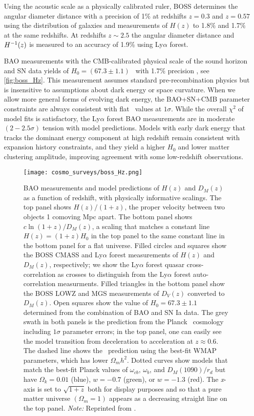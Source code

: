 Using the acoustic scale as a physically calibrated ruler, BOSS determines the angular diameter distance with a precision of 1\% at redshifts $z = 0.3$ and $z = 0.57$ using the distribution of galaxies and measurements of $H(z)$ to 1.8\% and 1.7\%  at the same redshifts. At redshifts $z\sim2.5$ the  angular diameter distance and $H^{-1}(z)$ is measured to an accuracy of 1.9\% using Ly$\alpha$ forest.

BAO measurements with the CMB-calibrated physical scale of the sound horizon and SN data yields of $H_0=(67.3\pm1.1)$ \unith\ with 1.7\% precision \cite{BOSS_results}, see \autoref{fig:boss_Hz}. This measurement assumes standard pre-recombination physics but is insensitive to assumptions about dark energy or space curvature. When we allow more general forms of evolving dark energy, the BAO+SN+CMB parameter constraints are always consistent with flat \LCDM\ values at $1\sigma$. While the overall $\chi^2$ of model fits is satisfactory, the Ly$\alpha$ forest BAO measurements are in moderate $(2-2.5\sigma)$ tension with model predictions. Models with early dark energy that tracks the dominant energy component at high redshift remain consistent with expansion history constraints, and they yield a higher $H_0$ and lower matter clustering amplitude, improving agreement with some low-redshift observations.
\begin{figure}[htbp]
    \centering
    \texttt{[image: cosmo\_surveys/boss\_Hz.png]}
    \caption{BAO measurements and model predictions of \(H(z)\) and \(D_M(z)\) as a function of redshift, with physically informative scalings. The top panel shows \(H(z)/(1+z)\), the proper velocity between two objects 1 comoving Mpc apart. The bottom panel shows \(c\ln{(1+z)}/D_M(z)\), a scaling that matches a constant line \(H(z)=(1+z)H_0\) in the top panel to the same constant line in the bottom panel for a flat universe. Filled circles and squares show the BOSS CMASS and Ly$\alpha$ forest measurements of \(H(z)\) and \(D_M(z)\), respectively; we show the Ly$\alpha$ forest quasar cross-correlation as crosses to distinguish from the Ly$\alpha$ forest auto-correlation measurments. Filled triangles in the bottom panel show the BOSS LOWZ and MGS measurements of \(D_V (z)\) converted to \(D_M(z)\). Open squares show the value of \(H_0 = 67.3\pm1.1\) \unith determined from the combination of BAO and SN Ia data. The grey swath in both panels is the prediction from the Planck \LCDM\ cosmology including \(1\sigma\) parameter errors; in the top panel, one can easily see the model transition from deceleration to acceleration at \(z\approx0.6\). The dashed line shows the \LCDM\ prediction using the best-fit WMAP parameters, which has lower \(\Omega_mh^2\). Dotted curves show models that match the best-fit Planck values of \(\omega_{cb}\), \(\omega_{b}\), and \(D_M(1090)/r_d\) but have \(\Omega_k = 0.01\) (blue), \(w = -0.7\) (green), or \(w = -1.3\) (red). The \textit{x}-axis is set to \(\sqrt{1+z}\) both for display purposes and so that a pure matter universe \((\Omega_m = 1)\) appears as a decreasing straight line on the top panel. \textit{Note:} Reprinted from \textcite{BOSS_results}.}
    \label{fig:boss_Hz}
\end{figure}
